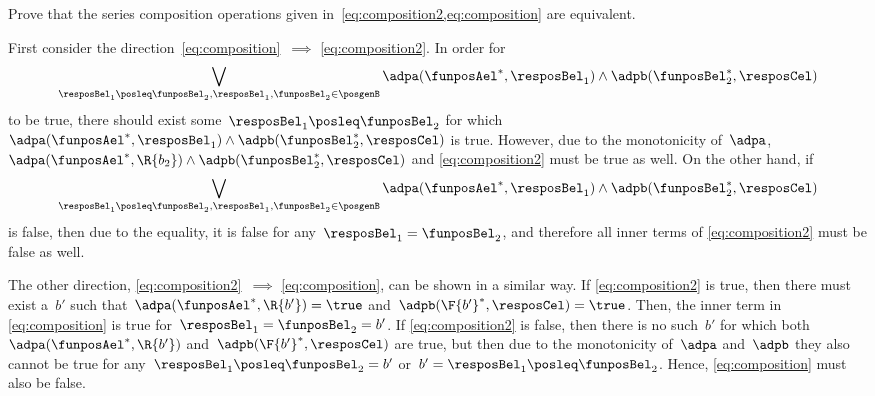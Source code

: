 \begin{exercise}
    \label{ex:composition_equivalency}
    Prove that the series composition operations given in~\cref{eq:composition2,eq:composition} are equivalent.
\end{exercise}
%
\begin{solution}
    First consider the direction~\cref{eq:composition}~$\implies$ \cref{eq:composition2}. In order for%
    \begin{equation*}
        \bigvee_{\resposBel_1\posleq\funposBel_2, \resposBel_1,\funposBel_2\in \posgenB} \adpa(\funposAel^*,\resposBel_1) \wedge \adpb(\funposBel_2^*,\resposCel)%
    \end{equation*}
    to be true, there should exist some~$\resposBel_1\posleq \funposBel_2$ for which~$\adpa(\funposAel^*,\resposBel_1) \wedge \adpb(\funposBel_2^*,\resposCel)$ is true.
    However, due to the monotonicity of~$\adpa$,~$\adpa(\funposAel^*,\R{b_2}) \wedge \adpb(\funposBel_2^*,\resposCel)$ and \cref{eq:composition2} must be true as well.
    On the other hand, if%
    \begin{equation*}
        \bigvee_{\resposBel_1\posleq\funposBel_2, \resposBel_1,\funposBel_2\in \posgenB} \adpa(\funposAel^*,\resposBel_1) \wedge \adpb(\funposBel_2^*,\resposCel)%
    \end{equation*}
    is false, then due to the equality, it is false for any~$\resposBel_1=\funposBel_2$, and therefore all inner terms of \cref{eq:composition2} must be false as well.

    The other direction, \cref{eq:composition2}~$\implies$ \cref{eq:composition}, can be shown in a similar way.
    If \cref{eq:composition2} is true, then there must exist a~$b'$ such that~$\adpa(\funposAel^*, \R{b'})=\true$ and~$\adpb(\F{b'}^*, \resposCel)=\true$.
    Then, the inner term in \cref{eq:composition} is true for~$\resposBel_1=\funposBel_2=b'$.
    If \cref{eq:composition2} is false, then there is no such~$b'$ for which both~$\adpa(\funposAel^*, \R{b'})$ and~$\adpb(\F{b'}^*, \resposCel)$ are true, but then due to the monotonicity of~$\adpa$ and~$\adpb$ they also cannot be true for any~$\resposBel_1 \posleq \funposBel_2 = b'$ or~$b'=\resposBel_1 \posleq \funposBel_2$.
    Hence, \cref{eq:composition} must also be false.
\end{solution}



